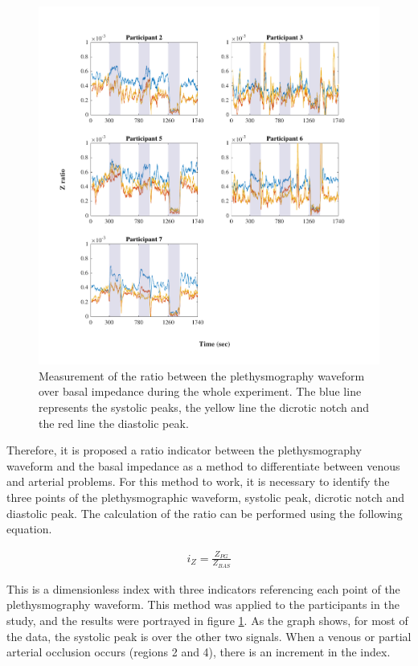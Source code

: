  \begin{figure}[!htpb]
 	\includegraphics[width=1\textwidth,keepaspectratio]{figure1}    
 	\caption[Ratio of the plethysmography waveform over basal impedance during the experiment]{Measurement of the ratio between the plethysmography waveform over basal impedance during the whole experiment. The blue line represents the systolic peaks, the yellow line the dicrotic notch and the red line the diastolic peak.}
 	\label{fig:ratio Z}
 \end{figure}

Therefore, it is proposed a ratio indicator between the plethysmography waveform and the basal impedance as a method to differentiate between venous and arterial problems. For this method to work, it is necessary to identify the three points of the plethysmographic waveform, systolic peak, dicrotic notch and diastolic peak. The calculation of the ratio can be performed using the following equation.

\begin{align}
	\label{eq:ratio Z}
	i_Z = \frac{Z_{PG}}{Z_{BAS}}
\end{align}


This is a dimensionless index with three indicators referencing each point of the plethysmography waveform. This method was applied to the participants in the study, and the results were portrayed in figure \ref{fig:ratio Z}. As the graph shows, for most of the data, the systolic peak is over the other two signals. When a venous or partial arterial occlusion occurs (regions 2 and 4), there is an increment in the index. 

